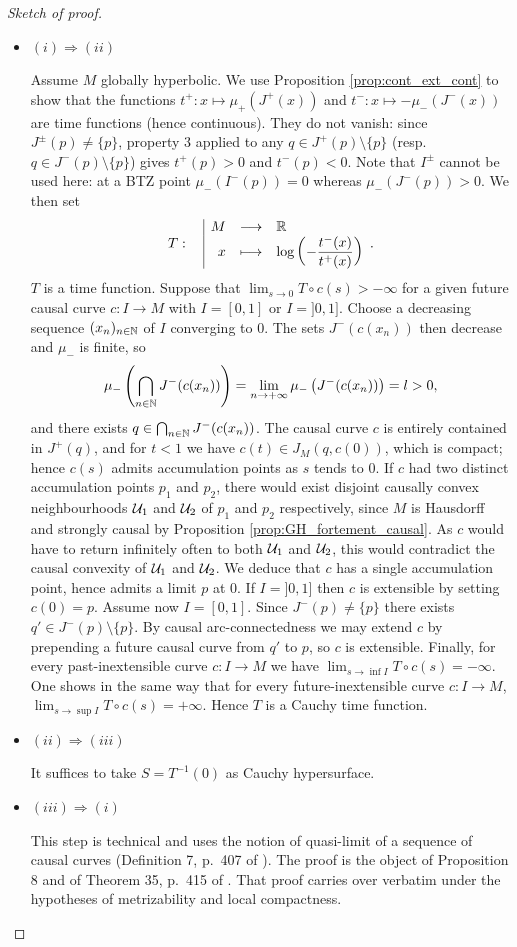 \documentclass[a4paper,twoside]{article}
\newcommand{\fonction}[5]{\displaystyle#1:\begin{array}{l|rcl}
& \displaystyle #2 & \longrightarrow & \displaystyle #3 \\
    & \displaystyle #4 & \longmapsto & \displaystyle #5 \end{array}}
\begin{document}
\begin{proof}[Sketch of proof]\
\begin{itemize}
\item \underline{$(i)\Rightarrow(ii)$}

Assume $M$ globally hyperbolic.
We use Proposition \ref{prop:cont_ext_cont} to show that the functions
$t^+:x\mapsto \mu_+(J^+(x))$ and $t^-:x\mapsto -\mu_-(J^-(x))$ are time functions (hence continuous).
They do not vanish: since $J^\pm(p)\neq \{p\}$, property $3$ applied to any $q\in J^+(p)\setminus\{p\}$
(resp. $q\in J^-(p)\setminus\{p\}$) gives $t^+(p)>0$ and $t^-(p)<0$. Note that $I^\pm$ cannot be used
here: at a BTZ point $\mu_-(I^-(p))=0$ whereas $\mu_-(J^-(p))>0$.
We then set $$\fonction{T}{M}{\RR}{x}{\log\left(-\frac{t^-(x)}{t^+(x)}\right)}.$$
$T$ is a time function. Suppose that $\lim_{s\rightarrow 0}T\circ c(s)>-\infty$ for a given future causal curve $c:I\rightarrow M$ with
$I=[0,1]$ or $ I=]0,1]$.
Choose a decreasing sequence $(x_n)_{n\in \mathbb{N}}$ of $I$ converging to $0$. The sets $J^-(c(x_n))$ then
decrease and $\mu_-$ is finite, so
$$\mu_-\left(\bigcap_{n\in \mathbb{N}}J^-(c(x_n))\right)=\lim_{n\rightarrow +\infty} \mu_-\left(J^-(c(x_n))\right)=l>0,$$
and there exists $q\in \bigcap_{n\in\mathbb{N}} J^-(c(x_n))$.
The causal curve $c$ is entirely contained in $J^+(q)$, and for $t<1$ we have $c(t)\in J_M(q,c(0))$,
which is compact; hence $c(s)$ admits accumulation points as $s$ tends to $0$.
If $c$ had two distinct accumulation points $p_1$ and $p_2$, there would exist disjoint causally convex neighbourhoods
$\mathcal{U}_1$ and $\mathcal{U}_2$ of $p_1$ and $p_2$ respectively, since $M$ is Hausdorff and strongly causal by Proposition \ref{prop:GH_fortement_causal}.
As $c$ would have to return infinitely often to both $\mathcal{U}_1$ and $\mathcal{U}_2$, this would contradict the causal convexity of $\mathcal{U}_1$ and $\mathcal{U}_2$.
We deduce that $c$ has a single accumulation point, hence admits a limit $p$ at $0$.
If $I=]0,1]$ then $c$ is extensible by setting $c(0)=p$. Assume now $I=[0,1]$.
Since $J^-(p)\neq \{p\}$ there exists $q'\in J^-(p)\setminus\{p\}$.
By causal arc-connectedness we may extend $c$ by prepending a future causal curve from $q'$ to $p$,
so $c$ is extensible.
Finally, for every past-inextensible curve $c:I\rightarrow M$ we have $\lim_{s\rightarrow \inf I} T\circ c(s)=-\infty$.
One shows in the same way that for every future-inextensible curve $c:I\rightarrow M$,
$\lim_{s\rightarrow \sup I} T\circ c(s)=+\infty$. Hence $T$ is a Cauchy time function.
\item \underline{$(ii)\Rightarrow(iii)$}

It suffices to take $S=T^{-1}(0)$ as Cauchy hypersurface.
\item \underline{$(iii)\Rightarrow(i)$}

This step is technical and uses the notion of quasi-limit of a sequence of causal curves (Definition 7, p.~407 of \cite{oneil}).
The proof is the object of Proposition 8 and of Theorem 35, p.~415 of \cite{oneil}. That proof carries over verbatim under the hypotheses
of metrizability and local compactness.
\end{itemize}
\end{proof}
\end{document}
